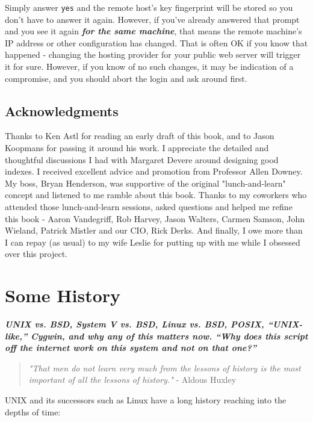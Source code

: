 \documentclass[10pt,american,]{book}
\numberwithin{figure}{chapter}
\begin{document}
Simply answer \texttt{yes} and the remote host's key fingerprint will be
stored so you don't have to answer it again. However, if you've already
answered that prompt and you see it again \textbf{\emph{for the same
machine}}, that means the remote machine's IP address or other
configuration has changed. That is often OK if you know that happened -
changing the hosting provider for your public web server will trigger it
for sure. However, if you know of no such changes, it may be indication
of a compromise, and you should abort the login and ask around first.

\section*{Acknowledgments}\label{acknowledgments}

Thanks to Ken Astl for reading an early draft of this book, and to Jason
Koopmans for passing it around his work. I appreciate the detailed and
thoughtful discussions I had with Margaret Devere around designing good
indexes. I received excellent advice and promotion from Professor Allen
Downey. My boss, Bryan Henderson, was supportive of the original
"lunch-and-learn" concept and listened to me ramble about this book.
Thanks to my coworkers who attended those lunch-and-learn sessions,
asked questions and helped me refine this book - Aaron Vandegriff, Rob
Harvey, Jason Walters, Carmen Samson, John Wieland, Patrick Mistler and
our CIO, Rick Derks. And finally, I owe more than I can repay (as usual)
to my wife Leslie for putting up with me while I obsessed over this
project.

\hypertarget{some-history}{\chapter{Some History}\label{some-history}}

\textbf{\emph{UNIX vs. BSD, System V vs. BSD, Linux vs. BSD, POSIX,
“UNIX-like,” Cygwin, and why any of this matters now. “Why does this
script off the internet work on this system and not on that one?”}}

\begin{quote}
\emph{"That men do not learn very much from the lessons of history is
the most important of all the lessons of history."} - Aldous Huxley
\end{quote}

UNIX and its successors such as Linux have a long history reaching into
the depths of time:
\end{document}
